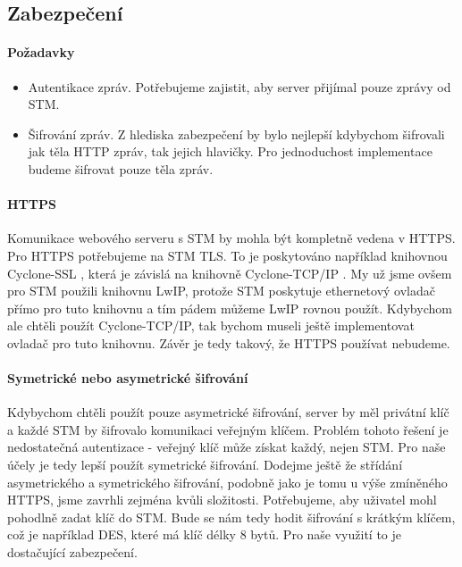 
\subsection{Zabezpečení}

\paragraph{Požadavky}
\begin{itemize}
    \item Autentikace zpráv. Potřebujeme zajistit, aby server přijímal pouze zprávy od STM.
    \item Šifrování zpráv. Z hlediska zabezpečení by bylo nejlepší kdybychom šifrovali jak těla HTTP
      zpráv, tak jejich hlavičky.
      Pro jednoduchost implementace budeme šifrovat pouze těla zpráv.
\end{itemize}


\paragraph{HTTPS}
Komunikace webového serveru s STM by mohla být kompletně vedena v HTTPS.
Pro HTTPS potřebujeme na STM TLS.
To je poskytováno například knihovnou Cyclone-SSL \cite{Cyclone-SSL}, která je závislá na knihovně
Cyclone-TCP/IP \cite{Cyclone-TCP/IP}.
My už jsme ovšem pro STM použili knihovnu LwIP, protože STM poskytuje ethernetový ovladač přímo
pro tuto knihovnu a tím pádem můžeme LwIP rovnou použít.
Kdybychom ale chtěli použít Cyclone-TCP/IP, tak bychom museli ještě implementovat ovladač pro
tuto knihovnu.
Závěr je tedy takový, že HTTPS používat nebudeme.

\paragraph{Symetrické nebo asymetrické šifrování}
Kdybychom chtěli použít pouze asymetrické šifrování, server by měl privátní klíč a každé STM
by šifrovalo komunikaci veřejným klíčem.
Problém tohoto řešení je nedostatečná autentizace - veřejný klíč může získat každý, nejen STM.
Pro naše účely je tedy lepší použít symetrické šifrování.
Dodejme ještě že střídání asymetrického a symetrického šifrování, podobně jako je tomu u výše zmíněného
HTTPS, jsme zavrhli zejména kvůli složitosti.
Potřebujeme, aby uživatel mohl pohodlně zadat klíč do STM.
Bude se nám tedy hodit šifrování s krátkým klíčem, což je například DES, které má
klíč délky 8 bytů.
Pro naše využití to je dostačující zabezpečení.


